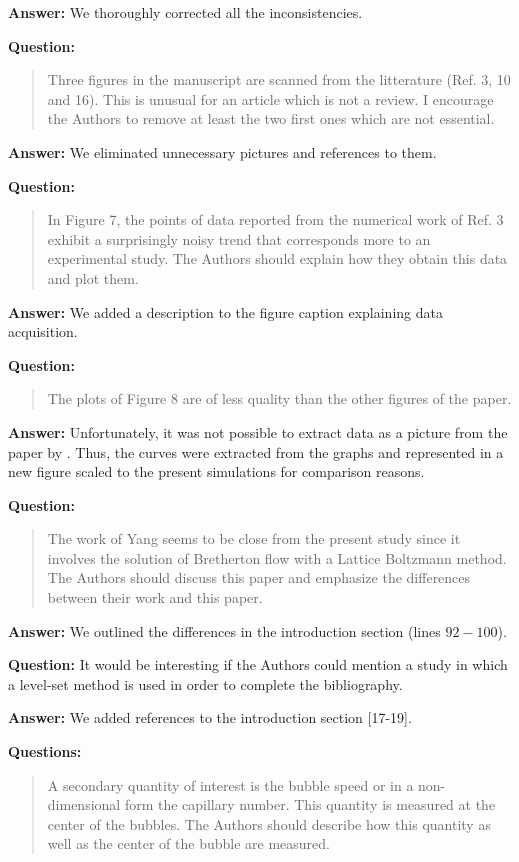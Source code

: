 \documentclass{article}
\begin{document}
\textbf{Answer:} We thoroughly corrected all the inconsistencies.

\textbf{Question:}
\begin{quotation}
Three figures in the manuscript are scanned from the litterature (Ref. 3, 10 and 16). This is
unusual
for an article which is not a review. I encourage the Authors to remove at least the two ﬁrst ones
which are not essential.
\end{quotation}

\textbf{Answer:} We eliminated unnecessary pictures and references to them.

\textbf{Question:} 
\begin{quotation}
In Figure 7, the points of data reported from the numerical work of Ref. 3 exhibit a surprisingly
noisy trend that corresponds more to an experimental study. The Authors should explain how they
obtain this data and plot them.
\end{quotation}

\textbf{Answer:} We added a description to the figure caption explaining data acquisition.

\textbf{Question:} 
\begin{quotation}
The plots of Figure 8 are of less quality than the other figures of the paper.
\end{quotation}

\textbf{Answer:} Unfortunately, it was not possible to extract data as a picture from the paper by
\citet{sehgal-microchannel}. Thus, the curves were extracted from the graphs and represented in a
new figure scaled to the present simulations for comparison reasons.

\textbf{Question:}
\begin{quotation}
The work of Yang seems to be close from the present study since it involves the
solution of Bretherton
flow with a Lattice Boltzmann method. The Authors should discuss this paper and emphasize the
differences between their work and this paper.
\end{quotation}

\textbf{Answer:} We outlined the differences in the introduction section (lines $92-100$).

\textbf{Question:} It would be interesting if the Authors could mention a study in which a level-set
method is used in
order to complete the bibliography.

\textbf{Answer:} We added references to the introduction section [17-19].

\textbf{Questions:} 
\begin{quotation}
A secondary quantity of interest is the bubble speed or in a non-dimensional
form the capillary
number. This quantity is measured at the center of the bubbles. The Authors should describe how
this quantity as well as the center of the bubble are measured.
\end{quotation}
\end{document}
